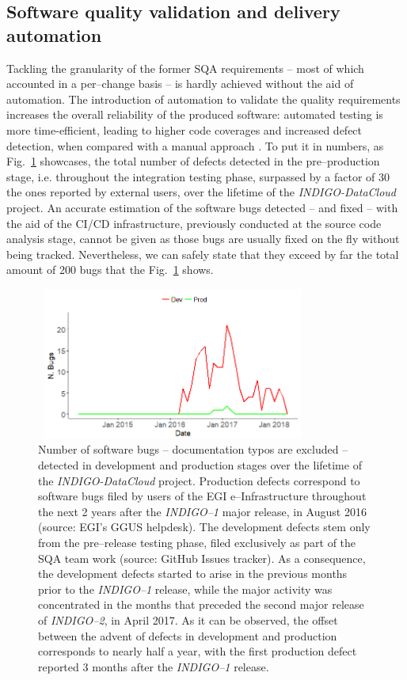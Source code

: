 \subsection{Software quality validation and delivery automation}\label{software-automation}
\label{sec:devops}
Tackling the granularity of the former SQA requirements -- most of which accounted in a per--change basis --
is hardly achieved without the aid of automation. The introduction of automation to validate the quality
requirements increases the overall reliability of the produced software: automated testing is more
time-efficient, leading to higher code coverages and increased defect detection, when compared with a manual
approach \cite{rafi2012}. To put it in numbers, as Fig.~\ref{fig:indigobugs} showcases, the
total number of defects detected in the pre--production stage, i.e. throughout the integration testing phase, surpassed by a factor of 30
the ones reported by external users, over the lifetime of the {\sl INDIGO-DataCloud}
project. An accurate estimation of the software bugs detected -- and fixed -- with the aid of 
the CI/CD infrastructure, previously conducted at the source code analysis stage, cannot be
given as those bugs are usually fixed on the fly without being tracked. Nevertheless, we can
safely state that they exceed by far the total amount of 200 bugs that the Fig.~\ref{fig:indigobugs}
shows.
\begin{figure}[h]
\centering
\includegraphics[width=0.8\textwidth, height=50mm]{images/indigoBugs.png}
\caption{Number of software bugs -- documentation typos are excluded -- detected in development 
and production stages over the lifetime of the {\sl INDIGO-DataCloud} project. Production 
defects correspond to software bugs filed by users of the EGI e--Infrastructure throughout 
the next 2 years after the {\sl INDIGO--1} major release, in August 2016 (source: EGI's GGUS
helpdesk). The development defects stem only from the pre--release testing phase, filed 
exclusively as part of the SQA team work (source: GitHub Issues tracker). As a consequence, the 
development defects started to arise in the previous months prior to the {\sl INDIGO--1} release, 
while the major activity was concentrated in the months that preceded the second major release 
of {\sl INDIGO--2}, in April 2017. As it can be observed, the offset between the advent of defects
in development and production corresponds to nearly half a year, with the first production defect
reported 3 months after the {\sl INDIGO--1} release.}

\label{fig:indigobugs}
\end{figure}


